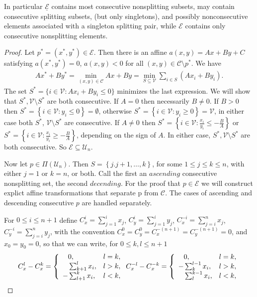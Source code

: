 \documentclass{article}
\theoremstyle{case}
\begin{document}
In particular $\underline{\mathcal{E}}$ contains most consecutive nonsplitting subsets, may contain consecutive splitting subsets, (but only singletons), and possibly nonconsecutive elements associated with a singleton splitting pair, while $\mathcal{E}$ contains only consecutive nonsplitting elements.
\begin{proof}
Let $p ^* = (x^*, y^*) \in \mathcal{E}$. Then there is an affine $a\left(x,y\right) = Ax + By + C$ satisfying $a(x^*, y^*) = 0$, $a(x,y) < 0$ for all $(x,y) \in \mathcal{C} \setminus p^*$.  We have
\begin{align}
Ax^* + By^* = \min_{(x,y) \in \mathcal{C}} Ax + By = \min_{S \subseteq \mathcal{V}} \sum_{i \in S} (Ax_i + By_i).
\end{align}
The set $S^* = \{ i \in \mathcal{V}: Ax_i + By_i \leq 0 \}$ minimizes the last expression. We will show that $S^*, \mathcal{V}\setminus S^*$ are both consecutive. If $A = 0$ then necessarily $B \neq 0$. If $B > 0$ then $S^* =\left\lbrace i \in \mathcal{V} \colon y_i \leq 0 \right\rbrace = \emptyset$, otherwise $S^* = \left\lbrace i \in \mathcal{V}  \colon y_i \geq 0 \right\rbrace = \mathcal{V}$, in either case both $S^*$, $\mathcal{V}\setminus S^*$ are consecutive. If $ A \neq 0$ then $S^* = \left\lbrace i \in \mathcal{V} \colon \frac{x_i}{y_i} \leq -\frac{B}{A} \right\rbrace$ or $S^* = \left\lbrace i \in \mathcal{V} \colon \frac{x_i}{y_i} \geq -\frac{B}{A} \right\rbrace$, depending on the sign of $A$. In either case, $S^*, \mathcal{V}\setminus S^*$ are both consecutive. So $\mathcal{E} \subseteq \mathcal{U}_n$.

Now let $p \in \Pi\left( \mathcal{U}_n\right)$. Then $S = \left\lbrace j.j+1, \dots, k \right\rbrace$, for some $1 \leq j \leq k \leq n$, with either $j = 1$ or $k = n$, or both. Call the first an $\textit{ascending}$ consecutive nonsplitting set, the second $\textit{decending}$. For the proof that $p \in \mathcal{E}$ we will construct explict affine transformations that separate p from $\mathcal{C}$. The cases of ascending and descending consecutive $p$ are handled separately.

For $0 \leq i \leq n+1$ define $C_x^i = \sum_{j=1}^i x_j$, $C_y^i = \sum_{j=1}^i y_j$, $C_x^{-i} = \sum_{j=i}^n x_j$, $C_y^{-i} = \sum_{j=i}^n y_j$, with the convention $C_x^0 = C_y^0 = C_x^{-(n+1)} = C_y^{-(n+1)} = 0$, and $x_0 = y_0 = 0$, so that we can write, for $0  \leq k,l \leq n+1$
\begin{align*}
C_x^l - C_x^k = \left\{
\begin{array}{ll}
  \hphantom{-}0, & l = k, \\
  \hphantom{-}\sum_{k+1}^l x_i, & l > k, \\
  -\sum_{l+1}^k x_i, & l < k, \\
\end{array} 
\right.    
C_x^{-l} - C_x^{-k} = \left\{
\begin{array}{ll}
  \hphantom{-}0, & l = k, \\
  -\sum_k^{l-1} x_i, & l > k, \\
  \hphantom{-}\sum_l^{k-1} x_i, & l < k, \\
\end{array} 
\right. 
\end{align*}


\end{proof}
\end{document}

